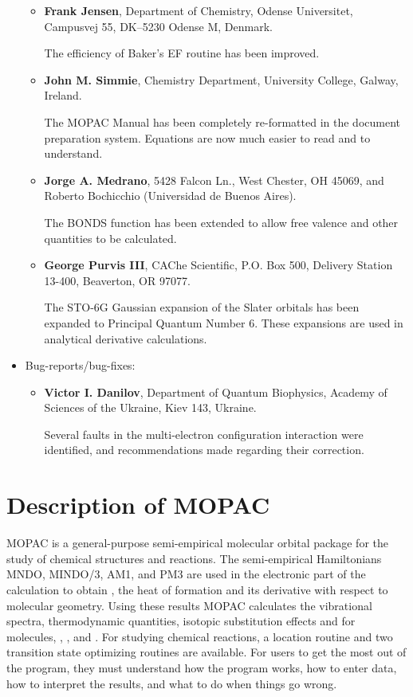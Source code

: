 \begin{itemize}
\begin{itemize}
\item {\large \bf Frank Jensen}, Department of Chemistry, Odense Universitet, Campusvej 55, DK--5230 Odense M, Denmark.
 
The efficiency of Baker's EF routine has been improved.
 
\item {\large \bf John M. Simmie}, Chemistry Department, University College, Galway, Ireland.

 The MOPAC Manual has been completely re-formatted in the 
document preparation
system.  Equations are now much easier to read and to understand.
\item {\large \bf Jorge A. Medrano}, 5428 Falcon Ln.,  West Chester, OH 45069,
and Roberto Bochicchio (Universidad de Buenos Aires).
 
The BONDS function has been extended to allow free valence and other quantities to be
calculated.
 
\item {\large \bf George Purvis III}, CAChe Scientific, P.O. Box 500, Delivery Station 13-400,
Beaverton, OR 97077.
 
The  STO-6G Gaussian expansion of the Slater orbitals has been expanded to Principal
Quantum Number 6.  These expansions are used in analytical derivative calculations.
\end{itemize}
\item Bug-reports/bug-fixes:
\begin{itemize}
\item {\large \bf Victor I. Danilov}, Department of Quantum Biophysics, Academy of
Sciences of the Ukraine, Kiev 143, Ukraine.
 
 Several faults in the multi-electron configuration interaction were identified,
and recommendations made regarding their correction.
\end{itemize}
\end{itemize}
\chapter{Description of MOPAC}
MOPAC is a general-purpose semi-empirical molecular orbital  package
for  the  study of chemical structures and reactions.  The semi-empirical
Hamiltonians MNDO, MINDO/3, AM1, and PM3 are used in the electronic  part
of  the  calculation  to obtain , 
the heat of formation
and its derivative with  respect  to  molecular  geometry.   Using  these
results   MOPAC   calculates   the   vibrational  spectra,  thermodynamic
quantities, isotopic substitution effects and  for
molecules, , , and . For studying  chemical
reactions, a  location routine and two  transition  state
optimizing  routines are available.  For users to get the most out of the
program, they must understand how the program works, how to  enter  data,
how to interpret the results, and what to do when things go wrong.

